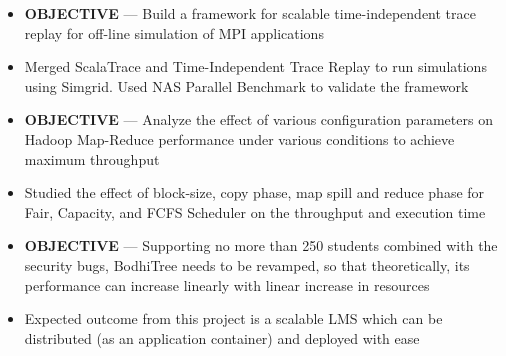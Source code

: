 \documentclass[10pt,a4paper]{altacv}
\begin{document}
\begin{itemize}
	\item \textbf{OBJECTIVE} --- Build a framework for scalable time-independent trace replay for off-line simulation of MPI applications
	\item Merged ScalaTrace and Time-Independent Trace Replay to run simulations using Simgrid. Used NAS Parallel Benchmark to validate the framework
\end{itemize}

\divider

\begin{itemize}
	\item \textbf{OBJECTIVE} --- Analyze the effect of various configuration parameters on Hadoop Map-Reduce performance under various conditions to achieve maximum throughput
	\item Studied the effect of block-size, copy phase, map spill and reduce phase for Fair, Capacity, and FCFS Scheduler on the throughput and execution time
\end{itemize}

\begin{itemize}
	\item \textbf{OBJECTIVE} --- Supporting no more than 250 students combined with the security bugs, BodhiTree needs to be revamped, so that theoretically, its performance can increase linearly with linear increase in resources
	\item Expected outcome from this project is a scalable LMS which can be distributed (as an application container) and deployed with ease
\end{itemize}
\end{document}
